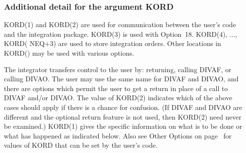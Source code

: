 \documentclass[twoside]{MATH77}
\begin{document}
\subsubsection{Additional detail for the argument KORD\label{KORD}}

KORD(1) and KORD(2) are used for communication between the user's code and
the integration package. KORD(3) is used with Option~18. KORD(4), ..., KORD(%
NEQ+3) are used to store integration orders. Other locations
in KORD() may be used with various options.

The integrator transfers control to the user by: returning, calling DIVAF,
or calling DIVAO. The user may use the same name for DIVAF and DIVAO, and
there are options which permit the user to get a return in place of a call
to DIVAF and/or DIVAO. The value of KORD(2) indicates which of the above
cases should apply if there is a chance for confusion. (If DIVAF and DIVAO
are different and the optional return feature is not used, then KORD(2) need
never be examined.) KORD(1) gives the specific information on what is to be
done or what has happened as indicated below.  Also see Other Options on
page~\pageref{OtherOpt} for values of KORD that can be set by the user's code.
\end{document}
